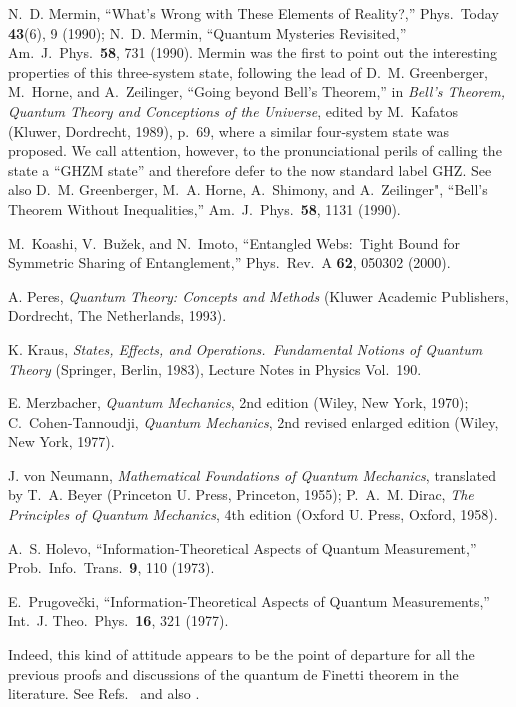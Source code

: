 \documentclass[12pt,aps,eqsecnum]{revtex4-1}
\begin{document}
\begin{thebibliography}{10}
N.~D. Mermin, ``What's Wrong with These Elements of Reality?,''
Phys.\ Today {\bf 43}(6), 9 (1990); N.~D. Mermin, ``Quantum
Mysteries Revisited,'' Am.\ J.\ Phys.\ {\bf 58}, 731 (1990). Mermin
was the first to point out the interesting properties of this
three-system state, following the lead of D.~M. Greenberger,
M.~Horne, and A.~Zeilinger, ``Going beyond Bell's Theorem,'' in {\sl
Bell's Theorem, Quantum Theory and Conceptions of the Universe},
edited by M.~Kafatos (Kluwer, Dordrecht, 1989), p.~69, where a
similar four-system state was proposed.  We call attention, however,
to the pronunciational perils of calling the state a ``GHZM state''
and therefore defer to the now standard label GHZ.  See also D.~M.
Greenberger, M.~A. Horne, A.~Shimony, and A.~Zeilinger", ``Bell's
Theorem Without Inequalities,'' Am.\ J.\ Phys.\ {\bf 58}, 1131
(1990).

M.~Koashi, V.~Bu\v{z}ek, and N.~Imoto, ``Entangled Webs:\ Tight Bound
for Symmetric Sharing of Entanglement,'' Phys.\ Rev.\ A {\bf 62},
050302 (2000).

A. Peres, {\sl Quantum Theory: Concepts and Methods\/} (Kluwer
Academic Publishers, Dordrecht, The Netherlands, 1993).

K. Kraus, {\sl States, Effects, and Operations.\ Fundamental Notions
of Quantum Theory\/} (Springer, Berlin, 1983), Lecture Notes in
Physics Vol.\ 190.

E. Merzbacher, {\sl Quantum Mechanics}, 2nd edition (Wiley, New
York, 1970); C.~Cohen-Tannoudji, {\sl Quantum Mechanics}, 2nd revised
enlarged edition (Wiley, New York, 1977).

J. von Neumann, {\sl Mathematical Foundations of Quantum Mechanics},
translated by T.~A. Beyer (Princeton U. Press, Princeton, 1955);
P.~A.~M. Dirac, {\sl The Principles of Quantum Mechanics}, 4th
edition (Oxford U. Press, Oxford, 1958).

A.~S. Holevo, ``Information-Theoretical Aspects of Quantum
Measurement,'' Prob.\ Info.\ Trans.\, {\bf 9}, 110 (1973).

E.~Prugove\v{c}ki, ``Information-Theoretical Aspects of Quantum
Measurements,'' Int.\ J. Theo.\ Phys.\ {\bf 16}, 321 (1977).

Indeed, this kind of attitude appears to be the point of departure
for all the previous proofs and discussions of the quantum de Finetti
theorem in the literature.  See
Refs.~\cite{Hudson1976,Hudson1981,Stormer1969} and also
\cite{DeFinettiLump}.


\end{thebibliography}
\end{document}
